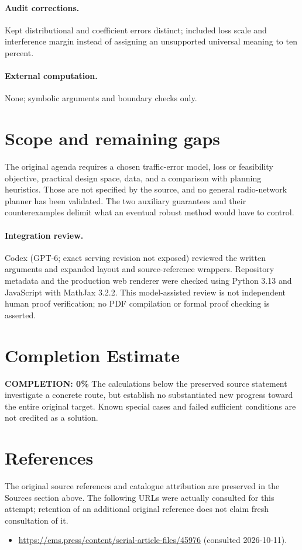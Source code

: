 \documentclass[11pt]{article}
\begin{document}
\paragraph{Audit corrections.} Kept distributional and coefficient errors distinct; included loss scale and interference margin instead of assigning an unsupported universal meaning to ten percent.
\paragraph{External computation.} None; symbolic arguments and boundary checks only.
\section{Scope and remaining gaps}
The original agenda requires a chosen traffic-error model, loss or feasibility objective, practical design space, data, and a comparison with planning heuristics. Those are not specified by the source, and no general radio-network planner has been validated. The two auxiliary guarantees and their counterexamples delimit what an eventual robust method would have to control.
\paragraph{Integration review.} Codex (GPT-6; exact serving revision not exposed) reviewed the written arguments and expanded layout and source-reference wrappers. Repository metadata and the production web renderer were checked using Python 3.13 and JavaScript with MathJax 3.2.2. This model-assisted review is not independent human proof verification; no PDF compilation or formal proof checking is asserted.

\section{Completion Estimate}
\noindent\textbf{COMPLETION: 0\%}
The calculations below the preserved source statement investigate a concrete route,
but establish no substantiated new progress toward the entire original target.
Known special cases and failed sufficient conditions are not credited as a solution.
\section{References}
The original source references and catalogue attribution are preserved in the
Sources section above. The following URLs were actually consulted for this attempt;
retention of an additional original reference does not claim fresh consultation of it.
\begin{itemize}
\item \url{https://ems.press/content/serial-article-files/45976} (consulted 2026-10-11). 
\end{itemize}
\end{document}
